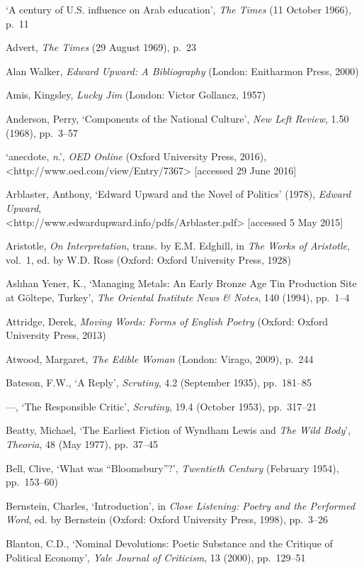 \documentclass[]{article}
\begin{document}
‘A century of U.S. influence on Arab education’, \emph{The Times} (11
October 1966), p.~11

Advert, \emph{The Times} (29 August 1969), p.~23

Alan Walker, \emph{Edward Upward: A Bibliography} (London: Enitharmon
Press, 2000)

Amis, Kingsley, \emph{Lucky Jim} (London: Victor Gollancz, 1957)

Anderson, Perry, ‘Components of the National Culture’, \emph{New Left
Review}, 1.50 (1968), pp.~3–57

‘anecdote, \emph{n}.’, \emph{OED Online} (Oxford University Press,
2016),\\
\textless{}http://www.oed.com/view/Entry/7367\textgreater{} {[}accessed
29 June 2016{]}

Arblaster, Anthony, ‘Edward Upward and the Novel of Politics’ (1978),
\emph{Edward Upward},\\
\textless{}http://www.edwardupward.info/pdfs/Arblaster.pdf\textgreater{}
{[}accessed 5 May 2015{]}

Aristotle, \emph{On Interpretation}, trans. by E.M. Edghill, in
\emph{The Works of Aristotle}, vol.~1, ed. by W.D. Ross (Oxford: Oxford
University Press, 1928)

Aslıhan Yener, K., ‘Managing Metals: An Early Bronze Age Tin Production
Site at Göltepe, Turkey’, \emph{The Oriental Institute News \& Notes},
140 (1994), pp.~1–4

Attridge, Derek, \emph{Moving Words: Forms of English Poetry} (Oxford:
Oxford University Press, 2013)

Atwood, Margaret, \emph{The Edible Woman} (London: Virago, 2009), p.~244

Bateson, F.W., ‘A Reply’, \emph{Scrutiny}, 4.2 (September 1935),
pp.~181–85

—, ‘The Responsible Critic’, \emph{Scrutiny}, 19.4 (October 1953),
pp.~317–21

Beatty, Michael, ‘The Earliest Fiction of Wyndham Lewis and \emph{The
Wild Body}’, \emph{Theoria}, 48 (May 1977), pp.~37–45

Bell, Clive, ‘What was “Bloomsbury”?’, \emph{Twentieth Century}
(February 1954), pp.~153–60)

Bernstein, Charles, ‘Introduction’, in \emph{Close Listening: Poetry and
the Performed Word}, ed. by Bernstein (Oxford: Oxford University Press,
1998), pp.~3–26

Blanton, C.D., ‘Nominal Devolutions: Poetic Substance and the Critique
of Political Economy’, \emph{Yale Journal of Criticism}, 13 (2000),
pp.~129–51
\end{document}
